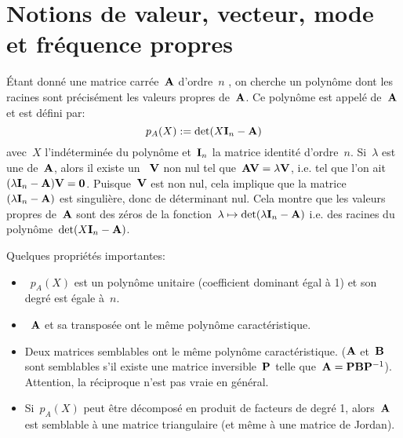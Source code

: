 
\medskip
\section{Notions de valeur, vecteur, mode et fréquence propres}

\medskip
Étant donné une matrice carrée~$\MM{A}$ d'ordre~$n$ , on cherche un polynôme dont les racines sont précisément les valeurs propres de~$\MM{A}$. Ce polynôme est appelé  de~$\MM{A}$ et est défini par:
\begin{equation} p_A(X):=\det(X\MM{I}_n-\MM{A})\end{equation}
avec~$X$ l'indéterminée du polynôme et~$\MM{I}_n$ la matrice identité d'ordre~$n$.
\medskipvm
Si~$\lambda$ est une  de~$\MM{A}$, alors il existe un ~$\VV{V}$ non nul tel que~$\MM{A}\VV{V} = \lambda \VV{V}$, i.e. tel que l'on ait~$(\lambda \MM{I}_n-\MM{A})\VV{V} = \VV{0}$.
\medskipvm
Puisque~$\VV{V}$ est non nul, cela implique que la matrice~$(\lambda \MM{I}_n-\MM{A})$ est singulière, donc de déterminant nul.
\medskipvm
Cela montre que les valeurs propres de~$\MM{A}$ sont des zéros de la fonction~$\lambda\mapsto \det(\lambda \MM{I}_n - \MM{A})$
i.e. des racines du polynôme~$\det(X\MM{I}_n-\MM{A})$.
\medskipvm
{}

\medskip
Quelques propriétés importantes:
\begin{itemize}
  \item~$p_A(X)$ est un polynôme unitaire (coefficient dominant égal à 1) et son degré
	est égale à~$n$.
  \item~$\MM{A}$ et sa transposée ont le même polynôme caractéristique.
  \item Deux matrices semblables ont le même polynôme caractéristique. ($\MM{A}$ et~$\MM{B}$ sont semblables s'il
	existe une matrice inversible~$\MM{P}$ telle que~$\MM{A} = \MM{P}\MM{B}\MMI{P}$).
	Attention, la réciproque n'est pas vraie en général.
  \item Si~$p_A(X)$ peut être décomposé en produit de facteurs de degré 1, alors~$\MM{A}$ est semblable
	à une matrice triangulaire (et même à une matrice de Jordan).
\end{itemize}

